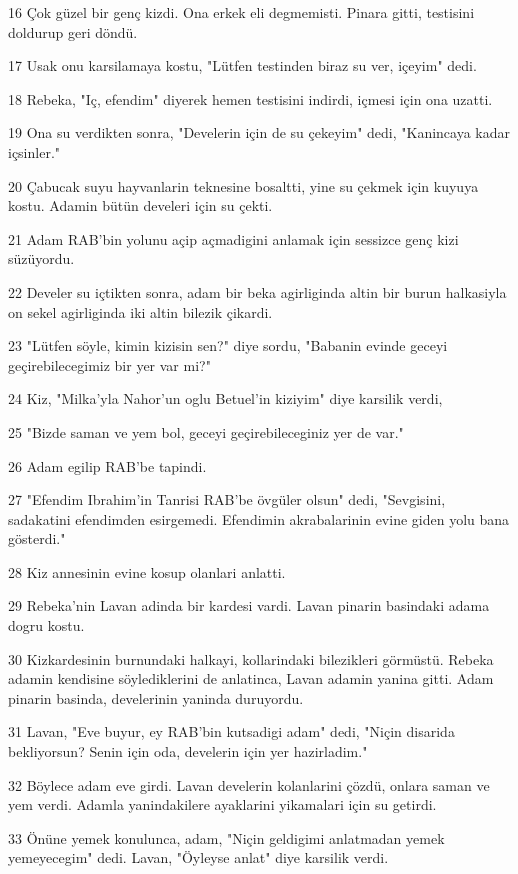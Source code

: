 \par 16 Çok güzel bir genç kizdi. Ona erkek eli degmemisti. Pinara gitti, testisini doldurup geri döndü.
\par 17 Usak onu karsilamaya kostu, "Lütfen testinden biraz su ver, içeyim" dedi.
\par 18 Rebeka, "Iç, efendim" diyerek hemen testisini indirdi, içmesi için ona uzatti.
\par 19 Ona su verdikten sonra, "Develerin için de su çekeyim" dedi, "Kanincaya kadar içsinler."
\par 20 Çabucak suyu hayvanlarin teknesine bosaltti, yine su çekmek için kuyuya kostu. Adamin bütün develeri için su çekti.
\par 21 Adam RAB'bin yolunu açip açmadigini anlamak için sessizce genç kizi süzüyordu.
\par 22 Develer su içtikten sonra, adam bir beka agirliginda altin bir burun halkasiyla on sekel agirliginda iki altin bilezik çikardi.
\par 23 "Lütfen söyle, kimin kizisin sen?" diye sordu, "Babanin evinde geceyi geçirebilecegimiz bir yer var mi?"
\par 24 Kiz, "Milka'yla Nahor'un oglu Betuel'in kiziyim" diye karsilik verdi,
\par 25 "Bizde saman ve yem bol, geceyi geçirebileceginiz yer de var."
\par 26 Adam egilip RAB'be tapindi.
\par 27 "Efendim Ibrahim'in Tanrisi RAB'be övgüler olsun" dedi, "Sevgisini, sadakatini efendimden esirgemedi. Efendimin akrabalarinin evine giden yolu bana gösterdi."
\par 28 Kiz annesinin evine kosup olanlari anlatti.
\par 29 Rebeka'nin Lavan adinda bir kardesi vardi. Lavan pinarin basindaki adama dogru kostu.
\par 30 Kizkardesinin burnundaki halkayi, kollarindaki bilezikleri görmüstü. Rebeka adamin kendisine söylediklerini de anlatinca, Lavan adamin yanina gitti. Adam pinarin basinda, develerinin yaninda duruyordu.
\par 31 Lavan, "Eve buyur, ey RAB'bin kutsadigi adam" dedi, "Niçin disarida bekliyorsun? Senin için oda, develerin için yer hazirladim."
\par 32 Böylece adam eve girdi. Lavan develerin kolanlarini çözdü, onlara saman ve yem verdi. Adamla yanindakilere ayaklarini yikamalari için su getirdi.
\par 33 Önüne yemek konulunca, adam, "Niçin geldigimi anlatmadan yemek yemeyecegim" dedi. Lavan, "Öyleyse anlat" diye karsilik verdi.
